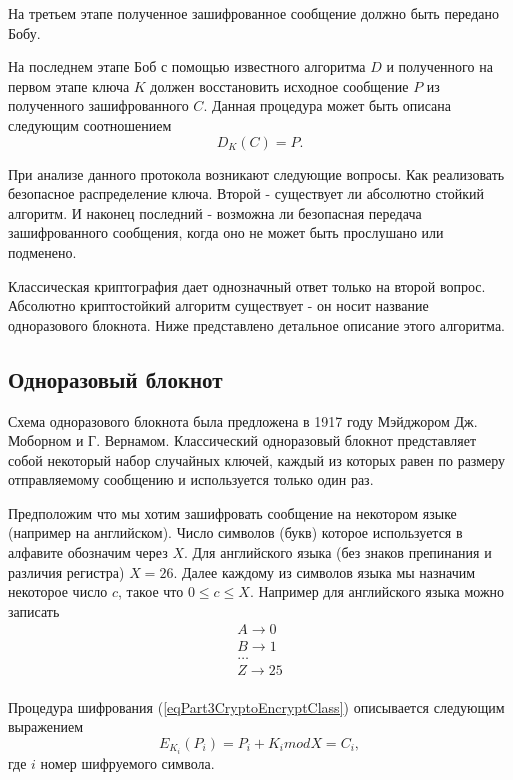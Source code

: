На третьем этапе полученное зашифрованное сообщение должно быть
передано Бобу.

На последнем этапе Боб с помощью известного алгоритма $D$ и полученного на
первом этапе ключа $K$ должен восстановить исходное сообщение $P$ из
полученного зашифрованного $C$. Данная процедура может быть описана
следующим соотношением
\begin{equation}
D_{K}\left(C\right) = P.
\label{eqPart3CryptoDeEncryptClass}
\end{equation}

При анализе данного протокола возникают следующие вопросы. Как
реализовать безопасное распределение ключа. Второй - существует ли
абсолютно стойкий алгоритм. И наконец последний - возможна ли
безопасная передача зашифрованного сообщения, когда оно не может быть
прослушано или подменено. 

Классическая криптография дает однозначный ответ только на второй
вопрос. Абсолютно криптостойкий алгоритм существует - он носит название
одноразового блокнота. Ниже представлено детальное описание этого алгоритма.

\subsection{Одноразовый блокнот}

Схема одноразового блокнота была предложена в 1917 году Мэйджором
Дж. Моборном и Г. Вернамом. Классический одноразовый блокнот представляет собой
некоторый набор случайных ключей, каждый из которых равен по размеру
отправляемому сообщению и используется только один раз. 

Предположим что мы хотим зашифровать сообщение на некотором языке
(например на английском). Число символов (букв) которое используется в
алфавите обозначим через $X$. Для английского языка (без знаков
препинания и различия регистра) $X = 26$. Далее каждому из символов
языка мы назначим некоторое число $c$, такое что $0 \le c \le
X$. Например для английского языка можно записать
\begin{equation}
\begin{array}{c}
A \rightarrow 0 \\
B \rightarrow 1 \\
\dots \\
Z \rightarrow 25 \\
\end{array}
\nonumber
\end{equation}
  
Процедура шифрования (\ref{eqPart3CryptoEncryptClass}) описывается
следующим выражением
\begin{equation}
E_{K_i}\left(P_i\right) = P_i + K_i mod X = C_i,
\label{eqPart3CryptoEncryptVernam}
\end{equation}
где $i$ номер шифруемого символа.

